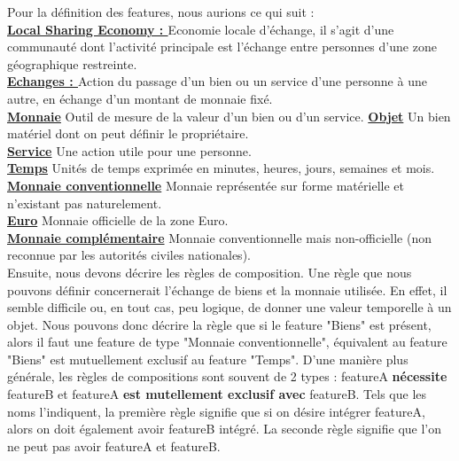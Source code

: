 Pour la définition des features,  nous aurions ce qui suit : \\
\textbf{\underline{Local Sharing Economy : }} Economie locale d'échange,  il s'agit d'une communauté dont l'activité principale est l'échange entre personnes d'une zone géographique restreinte. \\
\textbf{\underline{Echanges : }} Action du passage d'un bien ou un service d'une personne à une autre,  en échange d'un montant de monnaie fixé.\\
\textbf{\underline{Monnaie}} Outil de mesure de la valeur d'un bien ou d'un service.
\textbf{\underline{Objet}} Un bien matériel dont on peut définir le propriétaire. \\
\textbf{\underline{Service}} Une action utile pour une personne. \\
\textbf{\underline{Temps}} Unités de temps exprimée en minutes, heures,  jours,  semaines et mois.  \\
\textbf{\underline{Monnaie conventionnelle}} Monnaie représentée sur forme matérielle et n'existant pas naturelement. \\
\textbf{\underline{Euro}} Monnaie officielle de la zone Euro. \\
\textbf{\underline{Monnaie complémentaire}} Monnaie conventionnelle mais non-officielle (non reconnue par les autorités civiles nationales). \\


Ensuite,  nous devons décrire les règles de composition.  Une règle que nous pouvons définir concernerait l'échange de biens et la monnaie utilisée.  En effet,  il semble difficile ou,  en tout cas,  peu logique,  de donner une valeur temporelle à un objet.  Nous pouvons donc décrire la règle que si le feature "Biens" est présent,  alors il faut une feature de type "Monnaie conventionnelle",  équivalent au feature "Biens" est mutuellement exclusif au feature "Temps".  D'une manière plus générale,  les règles de compositions sont souvent de 2 types : featureA \textbf{nécessite} featureB et featureA \textbf{est mutellement exclusif avec} featureB.  Tels que les noms l'indiquent,  la première règle signifie que si on désire intégrer featureA,  alors on doit également avoir featureB intégré.  La seconde règle signifie que l'on ne peut pas avoir featureA et featureB. 


